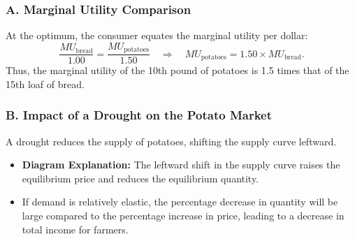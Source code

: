 \documentclass[12pt]{article}
\begin{document}
\subsubsection*{A. Marginal Utility Comparison}
At the optimum, the consumer equates the marginal utility per dollar:
\[
    \frac{MU_{\text{bread}}}{1.00} = \frac{MU_{\text{potatoes}}}{1.50} \quad \Longrightarrow \quad MU_{\text{potatoes}} = 1.50 \times MU_{\text{bread}}.
\]
Thus, the marginal utility of the 10th pound of potatoes is 1.5 times that of the 15th loaf of bread.

\subsubsection*{B. Impact of a Drought on the Potato Market}
A drought reduces the supply of potatoes, shifting the supply curve leftward.
\begin{itemize}[noitemsep]
    \item \textbf{Diagram Explanation:} The leftward shift in the supply curve raises the equilibrium price and reduces the equilibrium quantity.
    \item If demand is relatively elastic, the percentage decrease in quantity will be large compared to the percentage increase in price, leading to a decrease in total income for farmers.
\end{itemize}

\begin{center}
\end{center}
\end{document}
